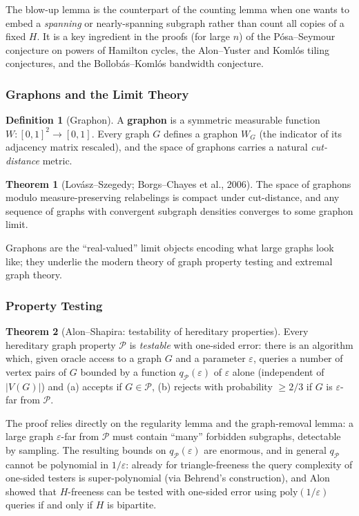\documentclass{article}
\theoremstyle{definition}
\newtheorem{theorem}{Theorem}
\newtheorem{definition}{Definition}
\begin{document}
The blow-up lemma is the counterpart of the counting lemma when one
wants to embed a \emph{spanning} or nearly-spanning subgraph rather
than count all copies of a fixed $H$. It is a key ingredient in the
proofs (for large $n$) of the P\'osa--Seymour conjecture on powers of
Hamilton cycles, the Alon--Yuster and Koml\'os tiling conjectures, and
the Bollob\'as--Koml\'os bandwidth conjecture.

\subsubsection{Graphons and the Limit Theory}

\begin{definition}[Graphon]
A \textbf{graphon} is a symmetric measurable function
$W : [0, 1]^2 \to [0, 1]$. Every graph $G$ defines a graphon $W_G$
(the indicator of its adjacency matrix rescaled), and the space of
graphons carries a natural \emph{cut-distance} metric.
\end{definition}

\begin{theorem}[Lov\'asz--Szegedy; Borgs--Chayes et al., 2006]
The space of graphons modulo measure-preserving relabelings is
compact under cut-distance, and any sequence of graphs with
convergent subgraph densities converges to some graphon limit.
\end{theorem}

Graphons are the ``real-valued'' limit objects encoding what large
graphs look like; they underlie the modern theory of graph property
testing and extremal graph theory.

\subsubsection{Property Testing}

\begin{theorem}[Alon--Shapira: testability of hereditary properties]
Every hereditary graph property $\mathcal P$ is \emph{testable} with
one-sided error: there is an algorithm which, given oracle access to
a graph $G$ and a parameter $\varepsilon$, queries a number of vertex pairs
of $G$ bounded by a function $q_{\mathcal P}(\varepsilon)$ of $\varepsilon$ alone
(independent of $|V(G)|$) and (a) accepts if $G \in \mathcal P$, (b) rejects with
probability $\ge 2/3$ if $G$ is $\varepsilon$-far from $\mathcal P$.
\end{theorem}

The proof relies directly on the regularity lemma and the
graph-removal lemma: a large graph $\varepsilon$-far from $\mathcal P$ must
contain ``many'' forbidden subgraphs, detectable by sampling. The
resulting bounds on $q_{\mathcal P}(\varepsilon)$ are enormous, and in general
$q_{\mathcal P}$ cannot be polynomial in $1/\varepsilon$: already for
triangle-freeness the query complexity of one-sided testers is
super-polynomial (via Behrend's construction), and Alon showed that
$H$-freeness can be tested with one-sided error using
$\mathrm{poly}(1/\varepsilon)$ queries if and only if $H$ is bipartite.
\end{document}
